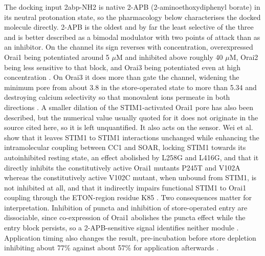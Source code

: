 The docking input 2abp-NH2 is native 2-APB (2-aminoethoxydiphenyl borate) in its neutral protonation state, so the pharmacology below characterises the docked molecule directly. 2-APB is the oldest and by far the least selective of the three and is better described as a bimodal modulator with two points of attack than as an inhibitor. On the channel its sign reverses with concentration, overexpressed Orai1 being potentiated around 5 \ensuremath{\mu}M and inhibited above roughly 40 \ensuremath{\mu}M, Orai2 being less sensitive to that block, and Orai3 being potentiated even at high concentration \cite{ref070}. On Orai3 it does more than gate the channel, widening the minimum pore from about 3.8 \angstrom{} in the store-operated state to more than 5.34 \angstrom{} and destroying calcium selectivity so that monovalent ions permeate in both directions \cite{ref092}. A smaller dilation of the STIM1-activated Orai1 pore has also been described, but the numerical value usually quoted for it does not originate in the source cited here, so it is left unquantified. It also acts on the sensor. Wei et al. show that it leaves STIM1 to STIM1 interactions unchanged while enhancing the intramolecular coupling between CC1 and SOAR, locking STIM1 towards its autoinhibited resting state, an effect abolished by L258G and L416G, and that it directly inhibits the constitutively active Orai1 mutants P245T and V102A whereas the constitutively active V102C mutant, when unbound from STIM1, is not inhibited at all, and that it indirectly impairs functional STIM1 to Orai1 coupling through the ETON-region residue K85 \cite{ref040}. Two consequences matter for interpretation. Inhibition of puncta and inhibition of store-operated entry are dissociable, since co-expression of Orai1 abolishes the puncta effect while the entry block persists, so a 2-APB-sensitive signal identifies neither module \cite{ref040}. Application timing also changes the result, pre-incubation before store depletion inhibiting about 77\% against about 57\% for application afterwards \cite{ref040}.

